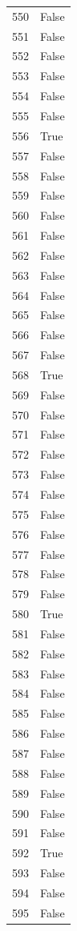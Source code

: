 \documentclass[
  letterpaper,
  DIV=11,
  numbers=noendperiod]{scrreprt}
\begin{document}
\begin{tabular}{ll}
550  &  False \\
551  &  False \\
552  &  False \\
553  &  False \\
554  &  False \\
555  &  False \\
556  &   True \\
557  &  False \\
558  &  False \\
559  &  False \\
560  &  False \\
561  &  False \\
562  &  False \\
563  &  False \\
564  &  False \\
565  &  False \\
566  &  False \\
567  &  False \\
568  &   True \\
569  &  False \\
570  &  False \\
571  &  False \\
572  &  False \\
573  &  False \\
574  &  False \\
575  &  False \\
576  &  False \\
577  &  False \\
578  &  False \\
579  &  False \\
580  &   True \\
581  &  False \\
582  &  False \\
583  &  False \\
584  &  False \\
585  &  False \\
586  &  False \\
587  &  False \\
588  &  False \\
589  &  False \\
590  &  False \\
591  &  False \\
592  &   True \\
593  &  False \\
594  &  False \\
595  &  False \\

\end{tabular}
\end{document}
